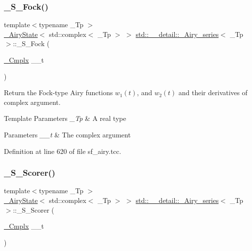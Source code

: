 \subsubsection{\texorpdfstring{\+\_\+\+S\+\_\+\+Fock()}{\_S\_Fock()}}
{\footnotesize\ttfamily template$<$typename \+\_\+\+Tp $>$ \\
\hyperlink{structstd_1_1____detail_1_1__AiryState}{\+\_\+\+Airy\+State}$<$ std\+::complex$<$ \+\_\+\+Tp $>$ $>$ \hyperlink{classstd_1_1____detail_1_1__Airy__series}{std\+::\+\_\+\+\_\+detail\+::\+\_\+\+Airy\+\_\+series}$<$ \+\_\+\+Tp $>$\+::\+\_\+\+S\+\_\+\+Fock (\begin{DoxyParamCaption}\item[{\hyperlink{classstd_1_1____detail_1_1__Airy__series_ab41161caa54609f4735987fbaed41d9d}{\+\_\+\+Cmplx}}]{\+\_\+\+\_\+t }\end{DoxyParamCaption})\hspace{0.3cm}{\ttfamily [static]}}

Return the Fock-\/type Airy functions $ w_1(t) $, and $ w_2(t) $ and their derivatives of complex argument.


\begin{DoxyTemplParams}{Template Parameters}
{\em \+\_\+\+Tp} & A real type \\
\hline
\end{DoxyTemplParams}

\begin{DoxyParams}{Parameters}
{\em \+\_\+\+\_\+t} & The complex argument \\
\hline
\end{DoxyParams}


Definition at line 620 of file sf\+\_\+airy.\+tcc.

\mbox{\label{classstd_1_1____detail_1_1__Airy__series_a71f68d64f0e202c4f98146f90c6b3298}} 
\subsubsection{\texorpdfstring{\+\_\+\+S\+\_\+\+Scorer()}{\_S\_Scorer()}}
{\footnotesize\ttfamily template$<$typename \+\_\+\+Tp $>$ \\
\hyperlink{structstd_1_1____detail_1_1__AiryState}{\+\_\+\+Airy\+State}$<$ std\+::complex$<$ \+\_\+\+Tp $>$ $>$ \hyperlink{classstd_1_1____detail_1_1__Airy__series}{std\+::\+\_\+\+\_\+detail\+::\+\_\+\+Airy\+\_\+series}$<$ \+\_\+\+Tp $>$\+::\+\_\+\+S\+\_\+\+Scorer (\begin{DoxyParamCaption}\item[{\hyperlink{classstd_1_1____detail_1_1__Airy__series_ab41161caa54609f4735987fbaed41d9d}{\+\_\+\+Cmplx}}]{\+\_\+\+\_\+t }\end{DoxyParamCaption})\hspace{0.3cm}{\ttfamily [static]}}

